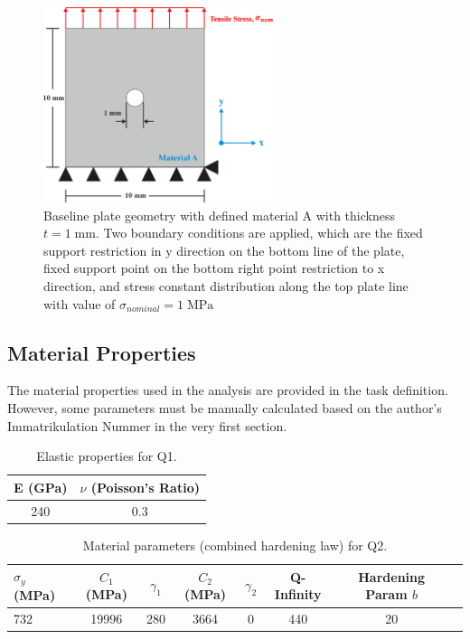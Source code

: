 \documentclass[12pt]{article}
\begin{document}
\begin{figure}[H]
    \centering
    \includegraphics[width=0.6\textwidth]{images/GEO_Base.png}
    \caption{Baseline plate geometry with defined material A with thickness $t = 1 \;\text{mm}$. Two boundary conditions are applied, which are the 
        fixed support restriction in y direction on the bottom line of the plate, fixed support point on the bottom right point restriction to 
        x direction, and stress constant distribution along the top plate line with value of $\sigma_{nominal} = 1 \;\text{MPa}$}
\end{figure}

\subsection{Material Properties}
\hspace*{2em}The material properties used in the analysis are provided in the task definition. However, 
some parameters must be manually calculated based on the author's Immatrikulation Nummer in the very first section.

\begin{table}[H]
    \centering
    \caption{Elastic properties for Q1.}
    \label{tab:materialQ1-properties}
    \begin{tabular}{ll}
        \toprule
        E (GPa) & $\nu$ (Poisson's Ratio) \\
        \midrule
        \multicolumn{1}{c}{240} & \multicolumn{1}{c}{0.3} \\
        \bottomrule
    \end{tabular}
\end{table}

\begin{table}[H]
    \centering
    \caption{Material parameters (combined hardening law) for Q2.}
    \label{tab:materialQ2-properties}
    \begin{tabular}{lccccccc}
        \toprule
        $\sigma_y$ (MPa) & $C_1$ (MPa) & $\gamma_1$ & $C_2$ (MPa) & $\gamma_2$ & Q-Infinity & Hardening Param $b$ \\
        \midrule
        732 & 19996 & 280 & 3664 & 0 & 440 & 20 \\
        \bottomrule
    \end{tabular}
\end{table}
\end{document}
